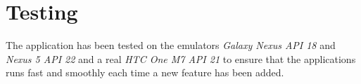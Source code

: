 \section{Testing}
The application has been tested on the emulators \emph{Galaxy Nexus API 18} and \emph{Nexus 5 API 22} and a real \emph{HTC One M7 API 21} to ensure that the applications runs fast and smoothly each time a new feature has been added.
